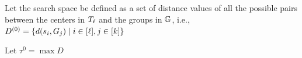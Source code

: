 \begin{algorithm}[]
    \SetAlgoNoEnd
    \caption{\findlambda}
    \label{alg:finding-lambda-ell}
    \SetAlgoLined
    \KwOut{$\lambda_{\ell}$}
    
    Let the search space be defined as a set of distance values of all the possible pairs between the centers in $T_{\ell}$ and the groups in $\mathbb{G}$, i.e., $D^{(0)} = \{d(s_i, G_j) \mid i \in [\ell], j \in [k]\}$

    Let $\tau^{0} = \max D $ 


\end{algorithm}
